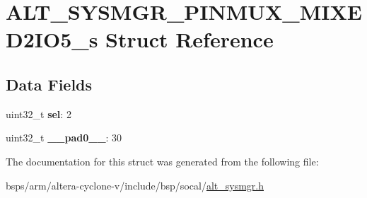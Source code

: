 \hypertarget{structALT__SYSMGR__PINMUX__MIXED2IO5__s}{}\section{A\+L\+T\+\_\+\+S\+Y\+S\+M\+G\+R\+\_\+\+P\+I\+N\+M\+U\+X\+\_\+\+M\+I\+X\+E\+D2\+I\+O5\+\_\+s Struct Reference}
\label{structALT__SYSMGR__PINMUX__MIXED2IO5__s}
\subsection*{Data Fields}
\begin{DoxyCompactItemize}
\item 
\mbox{\label{structALT__SYSMGR__PINMUX__MIXED2IO5__s_aea3b06ee39a580dad409e7c8b42ac2c9}} 
uint32\+\_\+t {\bfseries sel}\+: 2
\item 
\mbox{\label{structALT__SYSMGR__PINMUX__MIXED2IO5__s_adfda1d73e33ecc66adb3984335a60da0}} 
uint32\+\_\+t {\bfseries \+\_\+\+\_\+pad0\+\_\+\+\_\+}\+: 30
\end{DoxyCompactItemize}


The documentation for this struct was generated from the following file\+:\begin{DoxyCompactItemize}
\item 
bsps/arm/altera-\/cyclone-\/v/include/bsp/socal/\mbox{\hyperlink{alt__sysmgr_8h}{alt\+\_\+sysmgr.\+h}}\end{DoxyCompactItemize}
